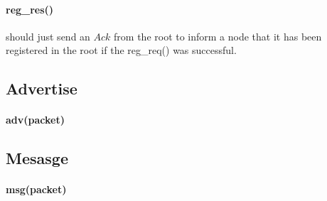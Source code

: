 \documentclass{article}
\begin{document}
\paragraph{reg\_res()} should just send an $Ack$ from the root  to inform a node that it has been registered in the root if the reg\_req() was successful.
\subsection{Advertise}
\paragraph{adv(packet)}
\subsection{Mesasge}
\paragraph{msg(packet)}
\clearpage
\end{document}

